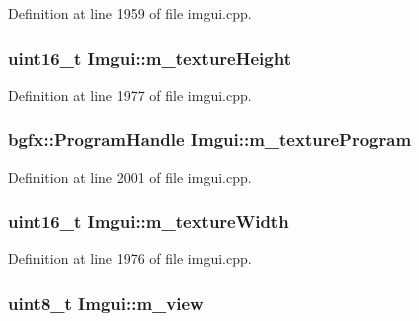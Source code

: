 Definition at line 1959 of file imgui.\+cpp.

\hypertarget{struct_imgui_a13ed484d71e4e612c09ef37a793901b7}{
\subsubsection[{m\+\_\+texture\+Height}]{\setlength{\rightskip}{0pt plus 5cm}uint16\+\_\+t Imgui\+::m\+\_\+texture\+Height}}\label{struct_imgui_a13ed484d71e4e612c09ef37a793901b7}


Definition at line 1977 of file imgui.\+cpp.

\hypertarget{struct_imgui_ae886887ae19a1a9a4b3232de7c9f6e44}{
\subsubsection[{m\+\_\+texture\+Program}]{\setlength{\rightskip}{0pt plus 5cm}bgfx\+::\+Program\+Handle Imgui\+::m\+\_\+texture\+Program}}\label{struct_imgui_ae886887ae19a1a9a4b3232de7c9f6e44}


Definition at line 2001 of file imgui.\+cpp.

\hypertarget{struct_imgui_a3851776e5fae774bbb128200ae886bcb}{
\subsubsection[{m\+\_\+texture\+Width}]{\setlength{\rightskip}{0pt plus 5cm}uint16\+\_\+t Imgui\+::m\+\_\+texture\+Width}}\label{struct_imgui_a3851776e5fae774bbb128200ae886bcb}


Definition at line 1976 of file imgui.\+cpp.

\hypertarget{struct_imgui_a5b3df19de612269c5f48ebe7eb904052}{
\subsubsection[{m\+\_\+view}]{\setlength{\rightskip}{0pt plus 5cm}uint8\+\_\+t Imgui\+::m\+\_\+view}}\label{struct_imgui_a5b3df19de612269c5f48ebe7eb904052}


